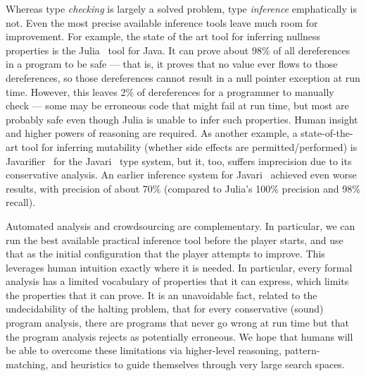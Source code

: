\documentclass{sig-alternate}
\def\<#1>{\codeid{#1}}
\newcommand{\codeid}[1]{\ifmmode{\mbox{\ttfamily{#1}}}\else{\ttfamily #1}\fi}
\begin{document}
Whereas type \emph{checking} is largely a solved problem, type
\emph{inference} emphatically is not.
Even the most precise available inference tools leave much room for
improvement.  For example, the state of the art tool for inferring
nullness properties is the
Julia~\cite{julia-web-interface,Spoto2008,Spoto10:LPAR,Spoto10,SpotoE2011}
tool for Java.  It can prove about 98\% of all dereferences in a
program to be safe --- that is, it proves that no \<null> value ever
flows to those dereferences, so those dereferences cannot result in a
null pointer exception at run time.  However, this leaves 2\% of
dereferences for a programmer to manually check --- some may be
erroneous code that might fail at run time, but most are probably safe
even though Julia is unable to infer such properties.  Human
insight and higher powers of reasoning are required.  As another
example, a state-of-the-art tool for inferring mutability (whether
side effects are permitted/performed) is
Javarifier~\cite{Quinonez2008,QuinonezTE2008} for the
Javari~\cite{BirkaE2004,TschantzE2005,Tschantz2006} type system, but
it, too, suffers imprecision due to its conservative analysis.  An
earlier inference system for
Javari~\cite{GreenfieldboyceF2005,GreenfieldboyceF2007} achieved even
worse results, with precision of about 70\% (compared to Julia's 100\%
precision and 98\% recall).


Automated analysis and crowdsourcing are complementary.  In
particular, we can run the best available practical inference tool
before the player starts, and use that as the initial configuration
that the player attempts to improve.  This leverages human intuition
exactly where it is needed.  In particular, every formal analysis has
a limited vocabulary of properties that it can express, which limits
the properties that it can prove.  It is an unavoidable fact, related
to the undecidability of the halting problem, that for every
conservative (sound) program analysis, there are programs that never
go wrong at run time but that the program analysis rejects as
potentially erroneous.  We hope that humans will be able to overcome
these limitations via higher-level reasoning, pattern-matching, and
heuristics to guide themselves through very large search spaces.

\end{document}

